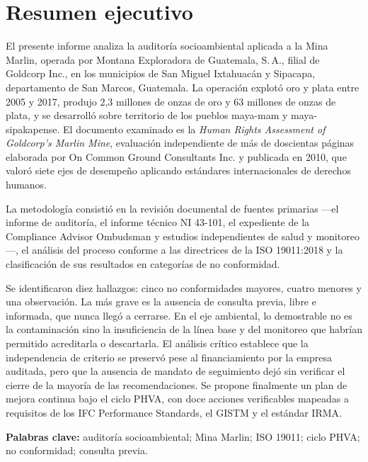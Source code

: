 %

\section*{Resumen ejecutivo}

El presente informe analiza la auditoría socioambiental aplicada a la Mina Marlin,
operada por Montana Exploradora de Guatemala, S.\,A., filial de Goldcorp Inc., en
los municipios de San Miguel Ixtahuacán y Sipacapa, departamento de San Marcos,
Guatemala. La operación explotó oro y plata entre 2005 y 2017, produjo 2,3
millones de onzas de oro y 63 millones de onzas de plata, y se desarrolló sobre
territorio de los pueblos maya-mam y maya-sipakapense. El documento examinado es
la \textit{Human Rights Assessment of Goldcorp's Marlin Mine}, evaluación
independiente de más de doscientas páginas elaborada por On Common Ground
Consultants Inc. y publicada en 2010, que valoró siete ejes de desempeño
aplicando estándares internacionales de derechos humanos.

La metodología consistió en la revisión documental de fuentes primarias —el
informe de auditoría, el informe técnico NI 43-101, el expediente de la
Compliance Advisor Ombudsman y estudios independientes de salud y monitoreo—, el
análisis del proceso conforme a las directrices de la ISO 19011:2018 y la
clasificación de sus resultados en categorías de no conformidad.

Se identificaron diez hallazgos: cinco no conformidades mayores, cuatro menores y
una observación. La más grave es la ausencia de consulta previa, libre e
informada, que nunca llegó a cerrarse. En el eje ambiental, lo demostrable no es
la contaminación sino la insuficiencia de la línea base y del monitoreo que
habrían permitido acreditarla o descartarla. El análisis crítico establece que la
independencia de criterio se preservó pese al financiamiento por la empresa
auditada, pero que la ausencia de mandato de seguimiento dejó sin verificar el
cierre de la mayoría de las recomendaciones. Se propone finalmente un plan de
mejora continua bajo el ciclo PHVA, con doce acciones verificables mapeadas a
requisitos de los IFC Performance Standards, el GISTM y el estándar IRMA.

\vspace{0.5cm}
\noindent\textbf{Palabras clave:} auditoría socioambiental; Mina Marlin;
ISO 19011; ciclo PHVA; no conformidad; consulta previa.
